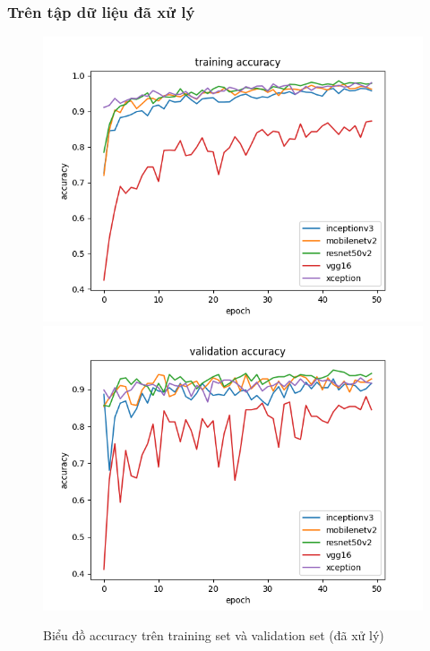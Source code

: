 \documentclass[a4paper,14pt]{extarticle}
\begin{document}
	\subsubsection{Trên tập dữ liệu đã xử lý}
		\begin{figure}[H]
			\centering
			\includegraphics[scale=0.45]{images/accuracy.png}
			\includegraphics[scale=0.45]{images/val_accuracy.png}
			\caption{Biểu đồ accuracy trên training set và validation set (đã xử lý)}
		\end{figure}
\end{document}
